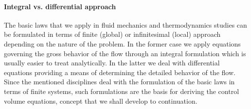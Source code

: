 \documentclass[12pt]{article}
\begin{document}
\paragraph{Integral vs. differential approach}
The basic laws that we apply in fluid mechanics and thermodynamics studies can be formulated in terms of finite (global) or infinitesimal (local) approach depending on the nature of the problem. In the former case we apply equations governing the gross behavior of the flow through an integral formulation which is usually easier to treat analytically. In the latter we deal with differential equations providing a means of determining the detailed behavior of the flow. Since the mentioned disciplines deal with the formulation of the basic laws in terms of finite systems, such formulations are the basis for deriving the control volume equations, concept that we shall develop to continuation.  
\end{document}
